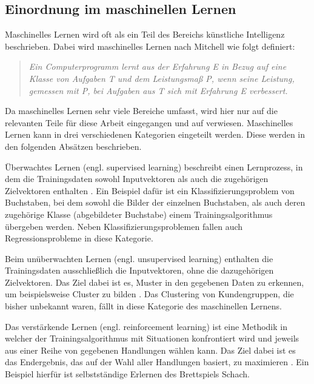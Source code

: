 \subsection{Einordnung im maschinellen Lernen}
\label{grundlagen_nn_ml}

Maschinelles Lernen wird oft als ein Teil des Bereichs künstliche Intelligenz beschrieben. Dabei wird maschinelles Lernen nach Mitchell \cite{mitchell1997machine} wie folgt definiert:

\begin{quote}
\textit{\glqq Ein Computerprogramm lernt aus der Erfahrung E in Bezug auf eine Klasse von Aufgaben T und dem Leistungsmaß P, wenn seine Leistung, gemessen mit P, bei Aufgaben aus T sich mit Erfahrung E verbessert.\grqq}
\end{quote}

Da maschinelles Lernen sehr viele Bereiche umfasst, wird hier nur auf die relevanten Teile für diese Arbeit eingegangen und auf \cite{mitchell1997machine} verwiesen. Maschinelles Lernen kann in drei verschiedenen Kategorien eingeteilt werden. Diese werden in den folgenden Absätzen beschrieben.

Überwachtes Lernen (engl. supervised learning) beschreibt einen Lernprozess, in dem die Trainingsdaten sowohl Inputvektoren als auch die zugehörigen Zielvektoren enthalten \cite{bishop2006pattern}. Ein Beispiel dafür ist ein Klassifizierungsproblem von Buchstaben, bei dem sowohl die Bilder der einzelnen Buchstaben, als auch deren zugehörige Klasse (abgebildeter Buchstabe) einem Trainingsalgorithmus übergeben werden. Neben Klassifizierungsproblemen fallen auch Regressionsprobleme in diese Kategorie.

Beim unüberwachten Lernen (engl. unsupervised learning) enthalten die Trainingsdaten ausschließlich die Inputvektoren, ohne die dazugehörigen Zielvektoren. Das Ziel dabei ist es, Muster in den gegebenen Daten zu erkennen, um beispielsweise Cluster zu bilden \cite{bishop2006pattern}. Das Clustering von Kundengruppen, die bisher unbekannt waren, fällt in diese Kategorie des maschinellen Lernens.

Das verstärkende Lernen (engl. reinforcement learning) ist eine Methodik in welcher der Trainingsalgorithmus mit Situationen konfrontiert wird und jeweils aus einer Reihe von gegebenen Handlungen wählen kann. Das Ziel dabei ist es das Endergebnis, das auf der Wahl aller Handlungen basiert, zu maximieren \cite{sutton1998introduction}. Ein Beispiel hierfür ist selbstständige Erlernen des Brettspiels Schach.


